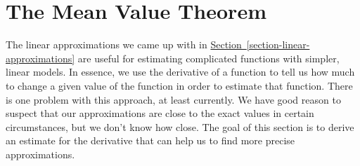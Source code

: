 \documentclass[10pt,]{book}
\numberwithin{equation}{section}
\begin{document}
%
%
\typeout{************************************************}
\typeout{************************************************}
%
\section[{The Mean Value Theorem}]{The Mean Value Theorem}\label{section-the-mean-value-theorem}
\begin{introduction}{}%
\hypertarget{p-328}{}%
The linear approximations we came up with in \hyperref[section-linear-approximations]{Section~\ref{section-linear-approximations}} are useful for estimating complicated functions with simpler, linear models. In essence, we use the derivative of a function to tell us how much to change a given value of the function in order to estimate that function. There is one problem with this approach, at least currently. We have good reason to suspect that our approximations are close to the exact values in certain circumstances, but we don't know how close. The goal of this section is to derive an estimate for the derivative that can help us to find more precise approximations.%
\end{introduction}%
%
%
\typeout{************************************************}
\typeout{************************************************}
%
\end{document}
